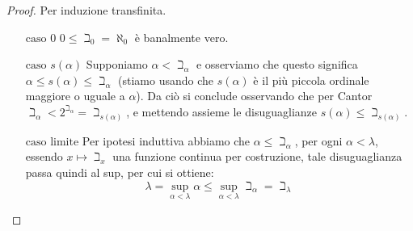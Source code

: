 \begin{proof}
	Per induzione transfinita.
	\begin{itemize}
		\item[$\boxed{\text{caso 0}}$] $0 \leq \beth_0 = \aleph_0$ è banalmente vero.
		\item[$\boxed{\text{caso $s(\alpha)$}}$] Supponiamo $\alpha < \beth_\alpha$ e osserviamo che questo significa $\alpha \leq s(\alpha) \leq \beth_\alpha$ (stiamo usando che $s(\alpha)$ è il più piccola ordinale maggiore o uguale a $\alpha$). Da ciò
		si conclude osservando che per Cantor $\beth_\alpha < 2^{\beth_\alpha} = \beth_{s(\alpha)}$, e mettendo assieme le disuguaglianze $s(\alpha) \leq \beth_{s(\alpha)}$.
		\item[$\boxed{\text{caso limite}}$] Per ipotesi induttiva abbiamo che $\alpha \leq \beth_\alpha$, per ogni $\alpha < \lambda$, essendo $x \mapsto \beth_x$ una funzione continua per costruzione, tale disuguaglianza passa quindi al sup, per cui si ottiene:
		\[ \lambda = \sup_{\alpha < \lambda} \alpha \leq \sup_{\alpha < \lambda} \beth_\alpha = \beth_\lambda
			\]
	\end{itemize}
\end{proof}


